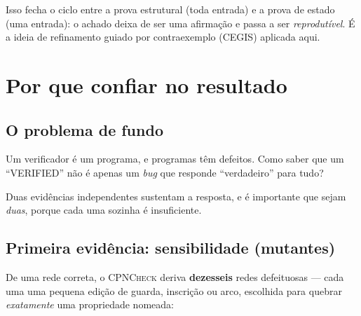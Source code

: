 \documentclass[11pt,a4paper]{report}
\newcommand{\cpn}{\textsc{CPNCheck}}
\begin{document}
Isso fecha o ciclo entre a prova estrutural (toda entrada) e a prova de estado
(uma entrada): o achado deixa de ser uma afirmação e passa a ser
\emph{reprodutível}. É a ideia de refinamento guiado por contraexemplo
(CEGIS) aplicada aqui.

\chapter{Por que confiar no resultado}

\section{O problema de fundo}

Um verificador é um programa, e programas têm defeitos. Como saber que um
``VERIFIED'' não é apenas um \emph{bug} que responde ``verdadeiro'' para tudo?

Duas evidências independentes sustentam a resposta, e é importante que sejam
\emph{duas}, porque cada uma sozinha é insuficiente.

\section{Primeira evidência: sensibilidade (mutantes)}

De uma rede correta, o \cpn{} deriva \textbf{dezesseis} redes defeituosas ---
cada uma uma pequena edição de guarda, inscrição ou arco, escolhida para
quebrar \emph{exatamente} uma propriedade nomeada:
\end{document}

